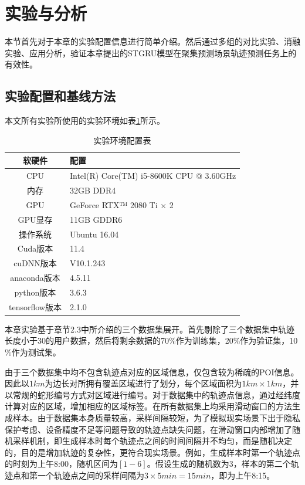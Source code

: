 \documentclass[master]{thesis-uestc}
\begin{document}
\section{实验与分析}
本节首先对于本章的实验配置信息进行简单介绍。然后通过多组的对比实验、消融实验、应用分析，验证本章提出的STGRU模型在聚集预测场景轨迹预测任务上的有效性。

\subsection{实验配置和基线方法}
\label{实验配置}
本文所有实验所使用的实验环境如表\ref{Table.3.1}所示。
\begin{table}[!ht]
\centering
\caption{实验环境配置表}%
\label{Table.3.1}
\begin{tabular}{cl}
\toprule[1.5pt]
软硬件& 配置\\
\midrule[0.75pt]
CPU& Intel(R) Core(TM) i5-8600K CPU @ 3.60GHz\\
内存& 32GB DDR4\\
GPU&  GeForce RTX™ 2080 Ti $\times$ 2\\
GPU显存& 11GB GDDR6\\
操作系统& Ubuntu 16.04\\
Cuda版本& 11.4\\
cuDNN版本& V10.1.243\\
anaconda版本& 4.5.11\\
python版本& 3.6.3\\
tensorflow版本& 2.1.0\\
\bottomrule[1.5pt]
\end{tabular}
\end{table}

本章实验基于章节2.3中所介绍的三个数据集展开。首先剔除了三个数据集中轨迹长度小于30的用户数据，然后将剩余数据的70$\%$作为训练集，20$\%$作为验证集，10$\%$作为测试集。

由于三个数据集中均不包含轨迹点对应的区域信息，仅包含较为稀疏的POI信息。因此以$1km$为边长对所拥有覆盖区域进行了划分，每个区域面积为$1km \times 1km$，并以常规的蛇形编号方式对区域进行编号。对于数据集中的轨迹点信息，通过经纬度计算对应的区域，增加相应的区域标签。在所有数据集上均采用滑动窗口的方法生成样本。由于数据集本身质量较高，采样间隔较短，为了模拟现实场景下出于隐私保护考虑、设备精度不足等问题导致的轨迹点缺失问题，在滑动窗口内部增加了随机采样机制，即生成样本时每个轨迹点之间的时间间隔并不均匀，而是随机决定的，目的是增加轨迹的复杂性，更符合现实场景。例如，生成样本时第一个轨迹点的时刻为上午8:00，随机区间为$[1-6]$。假设生成的随机数为3，样本的第二个轨迹点和第一个轨迹点之间的采样间隔为$3\times 5min=15min$，即为上午8:15。
\end{document}
